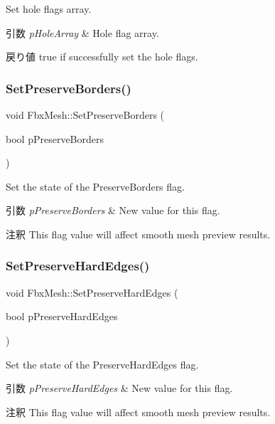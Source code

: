 Set hole flags array. 
\begin{DoxyParams}{引数}
{\em p\+Hole\+Array} & Hole flag array. \\
\hline
\end{DoxyParams}
\begin{DoxyReturn}{戻り値}
{\ttfamily true} if successfully set the hole flags. 
\end{DoxyReturn}
\mbox{\label{class_fbx_mesh_a462b090d01499b85ed9b19f42cdcef76}} 
\subsubsection{\texorpdfstring{Set\+Preserve\+Borders()}{SetPreserveBorders()}}
{\footnotesize\ttfamily void Fbx\+Mesh\+::\+Set\+Preserve\+Borders (\begin{DoxyParamCaption}\item[{bool}]{p\+Preserve\+Borders }\end{DoxyParamCaption})}

Set the state of the Preserve\+Borders flag. 
\begin{DoxyParams}{引数}
{\em p\+Preserve\+Borders} & New value for this flag. \\
\hline
\end{DoxyParams}
\begin{DoxyRemark}{注釈}
This flag value will affect smooth mesh preview results. 
\end{DoxyRemark}
\mbox{\label{class_fbx_mesh_adfaa804cd76983fc6a2603aef0c25acd}} 
\subsubsection{\texorpdfstring{Set\+Preserve\+Hard\+Edges()}{SetPreserveHardEdges()}}
{\footnotesize\ttfamily void Fbx\+Mesh\+::\+Set\+Preserve\+Hard\+Edges (\begin{DoxyParamCaption}\item[{bool}]{p\+Preserve\+Hard\+Edges }\end{DoxyParamCaption})}

Set the state of the Preserve\+Hard\+Edges flag. 
\begin{DoxyParams}{引数}
{\em p\+Preserve\+Hard\+Edges} & New value for this flag. \\
\hline
\end{DoxyParams}
\begin{DoxyRemark}{注釈}
This flag value will affect smooth mesh preview results. 
\end{DoxyRemark}
\mbox{\label{class_fbx_mesh_a1908668e29bfe832de7eec520d0d5cba}} 
